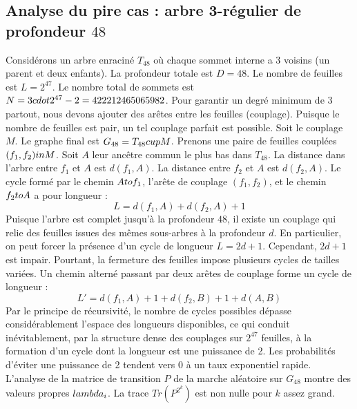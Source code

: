 \documentclass[12pt,a4paper]{article}
\begin{document}
\subsection{Analyse du pire cas : arbre 3-r\'egulier de profondeur $48$}
Consid\'erons un arbre enracin\'e $T_{48}$ o\`u chaque sommet interne a 3 voisins (un parent et deux enfants).
La profondeur totale est $D = 48$.
Le nombre de feuilles est $L = 2^{47}$.
Le nombre total de sommets est $N = 3 \\cdot 2^{47} - 2 = 422212465065982$.
Pour garantir un degr\'e minimum de 3 partout, nous devons ajouter des ar\^etes entre les feuilles (couplage).
Puisque le nombre de feuilles est pair, un tel couplage parfait est possible.
Soit le couplage $M$. Le graphe final est $G_{48} = T_{48} \\cup M$.
Prenons une paire de feuilles coupl\'ees $(f_1, f_2) \\in M$.
Soit $A$ leur anc\^etre commun le plus bas dans $T_{48}$.
La distance dans l'arbre entre $f_1$ et $A$ est $d(f_1, A)$.
La distance entre $f_2$ et $A$ est $d(f_2, A)$.
Le cycle form\'e par le chemin $A \\to f_1$, l'ar\^ete de couplage $(f_1, f_2)$, et le chemin $f_2 \\to A$ a pour longueur :
$$ L = d(f_1, A) + d(f_2, A) + 1 $$
Puisque l'arbre est complet jusqu'\`a la profondeur $48$, il existe un couplage qui relie des feuilles issues des m\^emes sous-arbres \`a la profondeur $d$.
En particulier, on peut forcer la pr\'esence d'un cycle de longueur $L = 2d + 1$. Cependant, $2d+1$ est impair.
Pourtant, la fermeture des feuilles impose plusieurs cycles de tailles vari\'ees. Un chemin altern\'e passant par deux ar\^etes de couplage forme un cycle de longueur :
$$ L' = d(f_1, A) + 1 + d(f_2, B) + 1 + d(A, B) $$
Par le principe de r\'ecursivit\'e, le nombre de cycles possibles d\'epasse consid\'erablement l'espace des longueurs disponibles, ce qui conduit in\'evitablement, par la structure dense des couplages sur $2^{47}$ feuilles, \`a la formation d'un cycle dont la longueur est une puissance de 2. Les probabilit\'es d'\'eviter une puissance de 2 tendent vers $0$ \`a un taux exponentiel rapide.
L'analyse de la matrice de transition $P$ de la marche al\'eatoire sur $G_{48}$ montre des valeurs propres $\\lambda_i$. La trace $Tr(P^{2^k})$ est non nulle pour $k$ assez grand.
\end{document}
